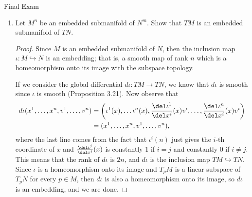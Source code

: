 \documentclass[12pt,letterpaper]{article}
\begin{document}
\pagestyle{fancy}
\begin{center}
{\LARGE Final Exam}%
\end{center}

\begin{enumerate}

\item Let $M^n$ be an embedded submanifold of $N^m$. Show that $TM$ is an embedded submanifold of $TN$.
\begin{proof}
Since $M$ is an embedded submanifold of $N$, then the inclusion map $\iota:M\hookrightarrow N$ is an embedding; that is, a smooth map of rank $n$ which is a homeomorphism onto its image with the subspace topology. 

If we consider the global differential $d\iota:TM\to TN$, we know that $d\iota$ is smooth since $\iota$ is smooth (Proposition 3.21). Now observe that 
\begin{align*}
d\iota(x^1, \dots, x^n, v^1, \dots, v^n)&= \left(\iota^1(x),\dots \iota^n(x), \frac{\del\iota^1}{\del x^i} (x)v^i, \dots, \frac{\del\iota^n}{\del x^i} (x)v^i\right) \\
&= (x^1, \dots, x^n,v^1, \dots, v^n),\\
\end{align*}
where the last line comes from the fact that $\iota^i(n)$ just gives the $i$-th coordinate of $x$ and $\frac{\del\iota^j}{\del x^i} (x)$ is constantly 1 if $i=j$ and constantly 0 if $i\neq j$. This means that the rank of $d\iota$ is $2n$, and $d\iota$ is the inclusion map $TM\hookrightarrow TN$. Since $\iota$ is a homeomorphism onto its image and $T_pM$ is a linear subspace of $T_pN$ for every $p\in M$, then $d\iota$ is also a homeomorphism onto its image, so $d\iota$ is an embedding, and we are done. 
\end{proof}


\end{enumerate}
\end{document}
